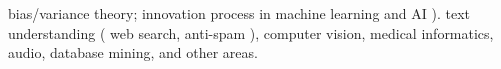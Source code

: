 \documentclass[11pt,a4paper]{moderncv}
\begin{document}
{                    bias/variance theory;                                                                         %
                    innovation process in machine learning and AI                                                 %
                ).                                                                                                %
                text understanding (                                                                              %
                    web search,                                                                                   %
                    anti-spam                                                                                     %
                ),                                                                                                %
                computer vision,                                                                                  %
                medical informatics,                                                                              %
                audio,                                                                                            %
                database mining,                                                                                  %
                and other areas.                                                                                  %
    }                                                                                                             %
\end{document}
